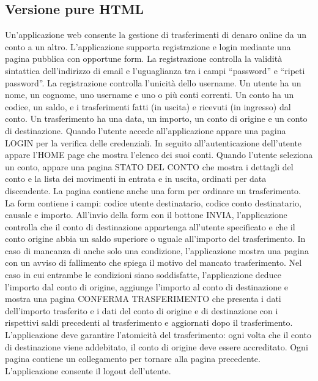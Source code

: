 \documentclass{article}
\begin{document}
	\subsection{Versione pure HTML}
		Un’applicazione web consente la gestione di trasferimenti di denaro online da un conto a un
		altro. L’applicazione supporta registrazione e login mediante una pagina pubblica con
		opportune form. La registrazione controlla la validità sintattica dell’indirizzo di email e
		l’uguaglianza tra i campi “password” e “ripeti password”. La registrazione controlla l’unicità
		dello username. Un utente ha un nome, un cognome, uno username e uno o più conti correnti.
		Un conto ha un codice, un saldo, e i trasferimenti fatti (in uscita) e ricevuti (in ingresso) dal
		conto. Un trasferimento ha una data, un importo, un conto di origine e un conto di destinazione.
		Quando l’utente accede all’applicazione appare una pagina LOGIN per la verifica delle
		credenziali. In seguito all’autenticazione dell’utente appare l’HOME page che mostra l’elenco
		dei suoi conti. Quando l’utente seleziona un conto, appare una pagina STATO DEL CONTO
		che mostra i dettagli del conto e la lista dei movimenti in entrata e in uscita, ordinati per data
		discendente. La pagina contiene anche una form per ordinare un trasferimento. La form
		contiene i campi: codice utente destinatario, codice conto destinatario, causale e importo.
		All’invio della form con il bottone INVIA, l’applicazione controlla che il conto di destinazione
		appartenga all’utente specificato e che il conto origine abbia un saldo superiore o uguale
		all’importo del trasferimento. In caso di mancanza di anche solo una condizione, l’applicazione
		mostra una pagina con un avviso di fallimento che spiega il motivo del mancato trasferimento.
		Nel caso in cui entrambe le condizioni siano soddisfatte, l’applicazione deduce l’importo dal
		conto di origine, aggiunge l’importo al conto di destinazione e mostra una pagina CONFERMA
		TRASFERIMENTO che presenta i dati dell’importo trasferito e i dati del conto di origine e di
		destinazione con i rispettivi saldi precedenti al trasferimento e aggiornati dopo il trasferimento.
		L’applicazione deve garantire l’atomicità del trasferimento: ogni volta che il conto di
		destinazione viene addebitato, il conto di origine deve essere accreditato. Ogni pagina
		contiene un collegamento per tornare alla pagina precedente. L’applicazione consente il
		logout dell’utente.
	
	\pagebreak
\end{document}
